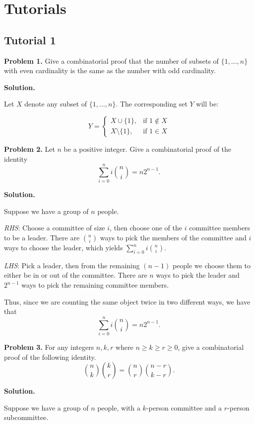 \chapter{Tutorials}

\section{Tutorial 1}
\textbf{Problem 1.} Give a combinatorial proof that the number of
subsets of $ \{1,\ldots ,n\} $ with even cardinality is the same as the
number with odd cardinality.

\textbf{Solution.}

Let $ X $ denote any subset of $ \{1,\ldots ,n\} $. The corresponding
set $ Y $ will be:

\[ Y = \begin{cases}
        X\cup \{1\},      & \text{if } 1\notin X \\
        X\setminus \{1\}, & \text{if } 1\in X
    \end{cases} \]

\textbf{Problem 2.} Let $ n $ be a positive integer. Give a combinatorial proof
of the identity
\[ \sum\limits_{i=0}^{n} i \binom{n}{i} = n2^{n-1}. \]

\textbf{Solution.}

Suppose we have a group of $ n $ people.

\emph{RHS}: Choose a committee of size $ i $, then choose one of
the $ i $ committee members to be a leader. There are $ \binom{n}{i} $
ways to pick the members of the committee and $ i $ ways to choose the leader,
which yields $ \sum\limits_{i=0}^{n} i\binom{n}{i} $.

\emph{LHS}: Pick a leader, then from the remaining $ (n-1) $ people
we choose them to either be in or out of the committee. There are
$ n $ ways to pick the leader and $ 2^{n-1} $ ways to pick
the remaining committee members.

Thus, since we are counting the same object twice in two different ways,
we have that
\[ \sum\limits_{i=0}^{n} i \binom{n}{i} = n2^{n-1}. \]

\textbf{Problem 3.} For any integers $ n,k,r $ where
$ n\geqslant k \geqslant r\geqslant 0 $, give a combinatorial proof
of the following identity.
\[ \binom{n}{k}\binom{k}{r}=\binom{n}{r}\binom{n-r}{k-r}. \]

\textbf{Solution.}

Suppose we have a group of $ n $ people, with a $ k $-person
committee and a $ r $-person subcommittee.

